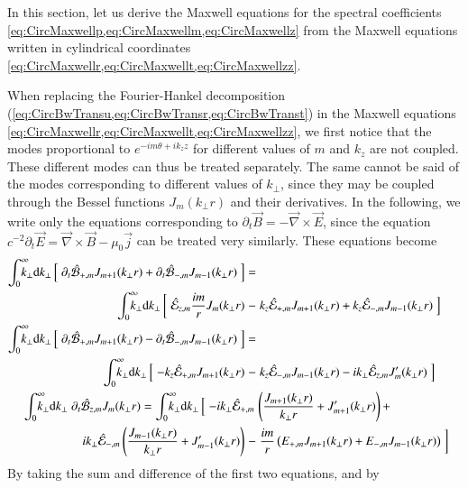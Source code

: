 In this section, let us derive the Maxwell equations for the spectral
coefficients \cref{eq:CircMaxwellp,eq:CircMaxwellm,eq:CircMaxwellz}
from the Maxwell equations written in cylindrical coordinates \cref{eq:CircMaxwellr,eq:CircMaxwellt,eq:CircMaxwellzz}.

When replacing the Fourier-Hankel decomposition
(\cref{eq:CircBwTransu,eq:CircBwTransr,eq:CircBwTranst}) in the
Maxwell equations \cref{eq:CircMaxwellr,eq:CircMaxwellt,eq:CircMaxwellzz}, we
first notice that the modes proportional to $e^{-im\theta +ik_z z}$ for different
values of $m$ and $k_z$ are not coupled. These different modes can
thus be treated separately. The same cannot be said of the modes
corresponding to different values of $k_\perp $, since they may be coupled
through the Bessel functions $J_m(k_\perp r)$ and their derivatives. 
In the following, we write only the equations corresponding to $\partial_t \vec{B} =
-\vec{\nabla}\times \vec{E}$, since the equation $c^{-2}\partial_t \vec{E} =
\vec{\nabla}\times\vec{B} - \mu_0 \vec{j}$ can be treated very
similarly. These equations become
\begin{align*}
\RInteg{k_\perp } \left[ \; \partial_t \spectral{B}_{+,m}  J_{m+1}(k_\perp r)
  + \partial_t \spectral{B}_{-,m}  J_{m-1}(k_\perp r) \; \right] =&& \\ 
\qquad \RInteg{k_\perp } \left[ \; \spectral{E}_{z,m} \frac{im}{r}
  J_m(k_\perp r) \right.-&\left.
  k_z\spectral{E}_{+,m}J_{m+1}(k_\perp r) + k_z\spectral{E}_{-,m}J_{m-1}(k_\perp r) \;
\right] & \\
\RInteg{k_\perp } \left[ \; \partial_t \spectral{B}_{+,m}  J_{m+1}(k_\perp r)
  - \partial_t \spectral{B}_{-,m}  J_{m-1}(k_\perp r) \; \right] =&& \\
 \RInteg{k_\perp } \left[ \; -k_z\spectral{E}_{+,m}J_{m+1}(k_\perp r)
 \right.-&\left.  k_z\spectral{E}_{-,m}J_{m-1}(k_\perp r) - ik_\perp \spectral{E}_{z,m} J_m'(k_\perp r) \;\right] \\
\RInteg{k_\perp }\; \partial_t \spectral{B}_{z,m}  J_{m}(k_\perp r) =
\RInteg{k_\perp } \left[ \; -ik_\perp
  \spectral{E}_{+,m}\right.&\left(\frac{J_{m+1}(k_\perp r)}{k_\perp r} +
    J_{m+1}'(k_\perp r) \right) + &\\
\left. ik_\perp \spectral{E}_{-,m}\left(\frac{J_{m-1}(k_\perp r)}{k_\perp r} +
    J_{m-1}'(k_\perp r) \right) \right.-&\left. \frac{im}{r} \left( E_{+,m} J_{m+1}(k_\perp r) +
    E_{-,m} J_{m-1}(k_\perp r) \right) \;\right] 
\end{align*}
By taking the sum and difference of the first two equations, and by
